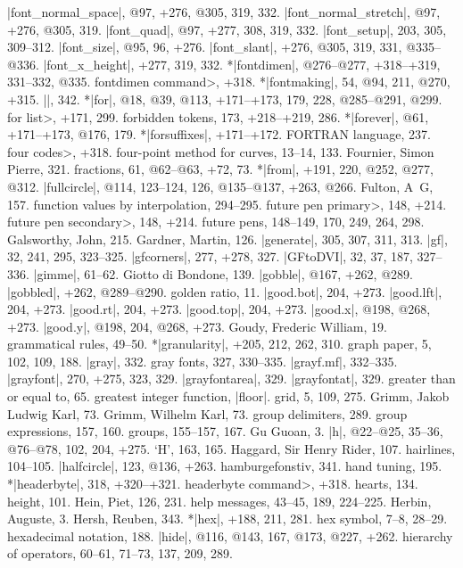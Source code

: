 |font_normal_space|, @97, +276, @305, 319, 332.
|font_normal_stretch|, @97, +276, @305, 319.
|font_quad|, @97, +277, 308, 319, 332.
|font_setup|, 203, 305, 309--312.
|font_size|, @95, 96, +276.
|font_slant|, +276, @305, 319, 331, @335--@336.
|font_x_height|, +277, 319, 332.
*|fontdimen|, @276--@277, +318--+319, 331--332, @335.
\<fontdimen command>, +318.
*|fontmaking|, 54, @94, 211, @270, +315.
|\fontname|, 342.
*|for|, @18, @39, @113, +171--+173, 179, 228, @285--@291, @299.
\<for list>, +171, 299.
forbidden tokens, 173, +218--+219, 286.
*|forever|, @61, +171--+173, @176, 179.
*|forsuffixes|, +171--+172.
{\sevenrm FORTRAN} language, 237.
\<four codes>, +318.
four-point method for curves, 13--14, 133.
Fournier, Simon Pierre, 321. %
fractions, 61, @62--@63, +72, 73.
*|from|, +191, 220, @252, @277, @312.
|fullcircle|, @114, 123--124, 126, @135--@137, +263, @266.
Fulton, A\period\ G\period, 157.
function values by interpolation, 294--295.
\<future pen primary>, 148, +214.
\<future pen secondary>, 148, +214.
future pens, 148--149, 170, 249, 264, 298.
\newletter
Galsworthy, John, 215.
Gardner, Martin, 126.
|generate|, 305, 307, 311, 313.
|gf|, 32, 241, 295, 323--325.
|gfcorners|, 277, +278, 327.
|GFtoDVI|, 32, 37, 187, 327--336.
|gimme|, 61--62.
Giotto di Bondone, 139.
|gobble|, @167, +262, @289.
|gobbled|, +262, @289--@290.
golden ratio, 11.
|good.bot|, 204, +273.
|good.lft|, 204, +273.
|good.rt|, 204, +273.
|good.top|, 204, +273.
|good.x|, @198, @268, +273.
|good.y|, @198, 204, @268, +273.
Goudy, Frederic William, 19.
grammatical rules, 49--50.
*|granularity|, +205, 212, 262, 310.
graph paper, 5, 102, 109, 188.
|gray|, 332.
gray fonts, 327, 330--335.
|grayf.mf|, 332--335.
|grayfont|, 270, +275, 323, 329.
|grayfontarea|, 329.
|grayfontat|, 329.
greater than or equal to, 65.
greatest integer function, \see |floor|.
grid, 5, 109, 275.
Grimm, Jakob Ludwig Karl, 73.
Grimm, Wilhelm Karl, 73.
group delimiters, 289.
group expressions, 157, 160.
groups, 155--157, 167.
Gu Guoan, 3.
\newletter
|h|, @22--@25, 35--36, @76--@78, 102, 204, +275.
`H', 163, 165.
Haggard, Sir Henry Rider, 107.
hairlines, 104--105.
|halfcircle|, 123, @136, +263.
hamburgefonstiv, 341.
hand tuning, 195.
*|headerbyte|, 318, +320--+321.
\<headerbyte command>, +318.
hearts, 134.
height, 101.
Hein, Piet, 126, 231.
help messages, 43--45, 189, 224--225.
Herbin, Auguste, 3.
Hersh, Reuben, 343.
*|hex|, +188, 211, 281.
hex symbol, 7--8, 28--29.
hexadecimal notation, 188.
|hide|, @116, @143, 167, @173, @227, +262.
hierarchy of operators, 60--61, 71--73, 137, 209, 289.
